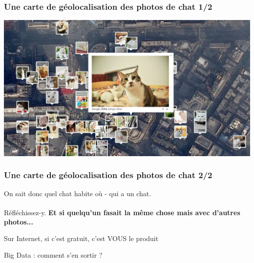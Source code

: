 \documentclass{beamer}
\begin{document}
\begin{frame}
\frametitle{Une carte de géolocalisation des photos de chat 1/2}
\begin{center}
\includegraphics[scale=0.3]{./images/Chat_geolocalisaion.png}
\end{center}
\end{frame}
\begin{frame}
\frametitle{Une carte de géolocalisation des photos de chat 2/2}
On sait donc quel chat habite où - qui a un chat.
\\~\\
Réfléchissez-y. \textbf{Et si quelqu'un fasait la même chose mais avec d'autres photos...}
\end{frame}

\begin{frame}
\begin{center}
\Huge{Sur Internet, si c'est gratuit, c'est VOUS le produit}
\end{center}
\end{frame}

\begin{frame}
\begin{center}
\Huge{Big Data : comment s'en sortir ?}
\end{center}
\end{frame}
\end{document}
